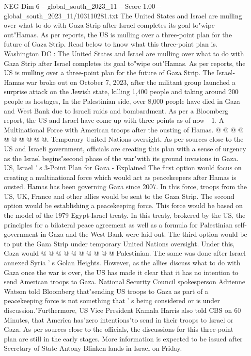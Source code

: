 \begin{textsample}{NEG Dim 6 – global\_south\_2023\_11 – Score 1.00 – global\_south\_2023\_11/103110281.txt}  \label{ex:f6_neg_195}
The United States and Israel are mulling over what to do with Gaza Strip after Israel completes its goal to"wipe out"Hamas.
As per reports, the US is mulling over a three-point plan for the future of Gaza Strip.
Read below to know what this three-point plan is.
Washington DC : The United States and Israel are mulling over what to do with Gaza Strip after Israel completes its goal to"wipe out"Hamas.
As per reports, the US is mulling over a three-point plan for the future of Gaza Strip.
The Israel-Hamas war broke out on October 7, 2023, after the militant group launched a surprise attack on the Jewish state, killing 1,400 people and taking around 200 people as hostages, In the Palestinian side, over 8,000 people have died in Gaza and West Bank due to Israeli raids and bombardment.
As per a Bloomberg report, the US and Israel have come up with three points as of now - 1.
A Multinational Force with American troops after the ousting of Hamas. @ @ @ @ @ @ @ @ @ @.
Temporary United Nations oversight.
As per sources close to the US and Israeli government, officials are creating this plan with a sense of urgency as the Israel begins"second phase of the war"with its ground invasions in Gaza.
US, Israel ' s 3-Point Plan for Gaza - Explained The first option would focus on creating a multinational force which would act as peacekeepers after Hamas is ousted.
Hamas has been governing Gaza since 2007.
In this force, troops from the US, UK, France and other allies would be sent to the Gaza Strip.
The second option would be establishing a peacekeeping force.
This force would be based on the model of the 1979 Egypt-Israel treaty.
In this treaty, brokered by the US, the principles for a bilateral peace agreement as well as a formula for Palestinian self-government in Gaza and the West Bank were laid out.
The third option would be to put the Gaza Strip under temporary United Nations oversight.
Under this, Gaza would @ @ @ @ @ @ @ @ @ @ Palestinian.
The same was done after Israel annexed Syria ' s Golan Heights.
However, as the allies discuss what to do with Gaza once the war is over, the US has made it clear that it has no intention to send American troops to Gaza.
National Security Council spokesperson Adrienne Watson told Bloomberg that"sending US troops to Gaza as part of a peacekeeping force is not something that ' s being considered or is under discussion."Furthermore, US Vice President Kamala Harris also told CBS on 60 Minutes, that America has"zero intentions"to send in their troops to Israel or Gaza.
As per sources close to the officials, the discussions for this three-point plan are still in the early stages.
More information is expected to be issued after Secretary of State Antony Blinken lands in Israel on Friday.

\end{textsample}
